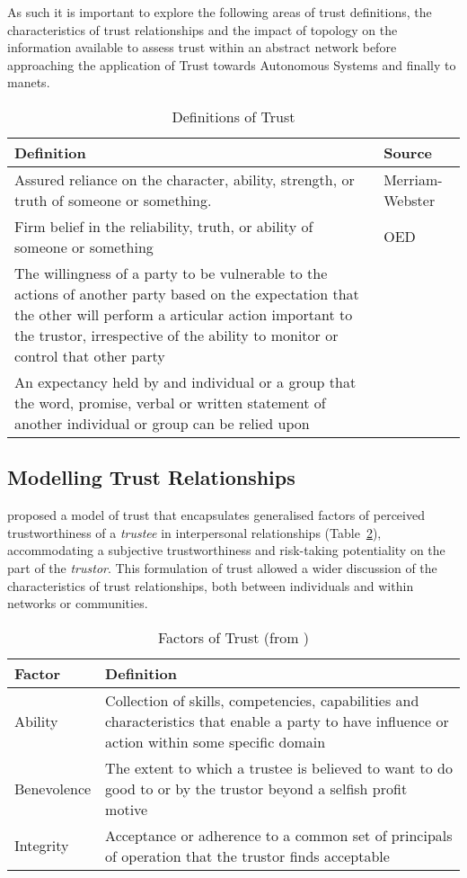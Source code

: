 As such it is important to explore the following areas of trust definitions, the characteristics of trust relationships and the impact of topology on the information available to assess trust within an abstract network before approaching the application of Trust towards Autonomous Systems and finally to \glspl{manet}.
%
\begin{table}[h]
  \centering
  \caption{Definitions of Trust}
  \label{tab:trust_definitions}
  \begin{tabularx}{\textwidth}{X p{3cm}}\toprule
    Definition & Source \\ \midrule
    Assured reliance on the character, ability, strength, or truth of someone or something.
    & Merriam-Webster\\
    Firm belief in the reliability, truth, or ability of someone or something & OED\\
    The willingness of a party to be vulnerable to the actions of another party based on the expectation that the other will perform a articular action important to the trustor, irrespective of the ability to monitor or control that other party & \citet{Mayer1995} \\
    An expectancy held by and individual or a group that the word, promise, verbal or written statement of another individual or group can be relied upon & \citet{Rotter1967}\\\bottomrule
  \end{tabularx}
\end{table}
%

\subsection{Modelling Trust Relationships}
\citet{Mayer1995} proposed a model of trust that encapsulates generalised factors of perceived trustworthiness of a \textit{trustee} in interpersonal relationships (Table~\ref{tab:trust_factors}), accommodating a subjective trustworthiness and risk-taking potentiality on the part of the \textit{trustor}.
This formulation of trust allowed a wider discussion of the characteristics of trust relationships, both between individuals and within networks or communities.

\begin{table}[h]
  \centering
  \caption[Factors of Trust]{Factors of Trust (from \citet{Mayer1995})}
  \label{tab:trust_factors}
  \begin{tabularx}{\textwidth}{p{2cm}X}\toprule
    Factor & Definition \\ \midrule
    Ability & Collection of skills, competencies, capabilities and characteristics that enable a party to have influence or action within some specific domain \\
    Benevolence & The extent to which a trustee is believed to want to do good to or by the trustor beyond a selfish profit motive\\
    Integrity & Acceptance or adherence to a common set of principals of operation that the trustor finds acceptable\\
    \bottomrule
  \end{tabularx}
\end{table}

